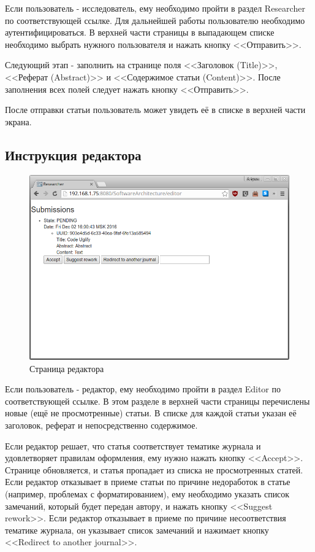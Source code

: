 Если пользователь - исследователь, ему необходимо пройти в раздел Researcher по соответствующей ссылке. Для дальнейшей работы пользователю необходимо аутентифицироваться. В верхней части страницы в выпадающем списке необходимо выбрать нужного пользователя и нажать кнопку <<Отправить>>.

Следующий этап - заполнить на странице поля <<Заголовок (Title)>>, <<Реферат (Abstract)>> и <<Содержимое статьи (Content)>>. После заполнения всех полей следует нажать кнопку <<Отправить>>.

После отправки статьи пользователь может увидеть её в списке в верхней части экрана.

\subsection{Инструкция редактора}

\begin{figure}[H]
\centering
\includegraphics[width=\textwidth]{editor.png}
\caption{Страница редактора}
\end{figure}

Если пользователь - редактор, ему необходимо пройти в раздел Editor по соответствующей ссылке. В этом разделе в верхней части страницы перечислены новые (ещё не просмотренные) статьи. В списке для каждой статьи указан её заголовок, реферат и непосредственно содержимое.

Если редактор решает, что статья соответствует тематике журнала и удовлетворяет правилам оформления, ему нужно нажать кнопку <<Accept>>. Странице обновляется, и статья пропадает из списка не просмотренных статей. Если редактор отказывает в приеме статьи по причине недоработок в статье (например, проблемах с форматированием), ему необходимо указать список замечаний, который будет передан автору, и нажать кнопку <<Suggest rework>>. Если редактор отказывает в приеме по причине несоответствия тематике журнала, он указывает список замечаний и нажимает кнопку <<Redirect to another journal>>.

